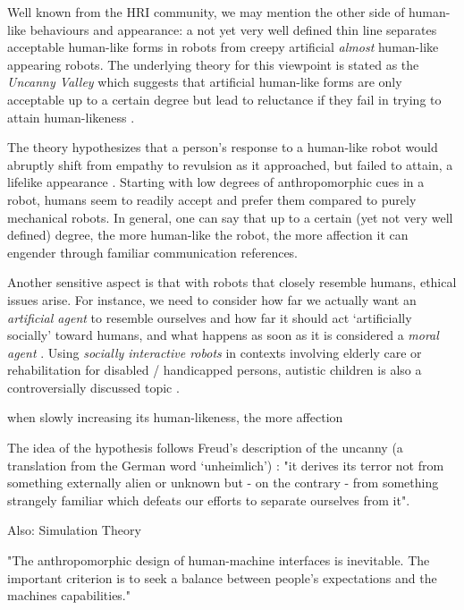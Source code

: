 \documentclass{acm_proc_article-sp}
\begin{document}
Well known from the HRI community, we may mention the other side of human-like
behaviours and appearance: a not yet very well defined thin line separates
acceptable human-like forms in robots from creepy artificial \textit{almost}
human-like appearing robots. The underlying theory for this viewpoint is stated
as the \textit{Uncanny Valley} \cite{mori_uncanny_1970} which suggests that
artificial human-like forms are only acceptable up to a certain degree but lead
to reluctance if they fail in trying to attain human-likeness .

The theory hypothesizes that a person's
response to a human-like robot would abruptly shift from empathy to revulsion
as it approached, but failed to attain, a lifelike appearance
\cite{mori_uncanny_1970}. Starting with low degrees of anthropomorphic cues in
a robot, humans seem to readily accept and prefer them compared to purely
mechanical robots. In general, one can say that up to a certain (yet not very
well defined) degree, the more human-like the robot, the more affection it can
engender through familiar communication references.

Another sensitive aspect is that with robots that closely resemble humans,
ethical issues arise. For instance, we need to consider how far we actually
want an \textit{artificial agent} to resemble ourselves and how far it should
act `artificially socially' toward humans, and what happens as soon as it is
considered a \textit{moral agent} \cite{sullins_when_2006}. Using
\textit{socially interactive robots} in contexts involving elderly care or
rehabilitation for disabled / handicapped persons, autistic children is also a
controversially discussed topic \cite{robins_robots_2005}.


when slowly increasing its human-likeness, the more affection 

The idea of the hypothesis follows Freud's description of the uncanny (a
translation from the German word `unheimlich') :
"it derives its terror not from something externally alien or unknown but - on
the contrary - from something strangely familiar which defeats our efforts to
separate ourselves from it". \cite{hegel_understanding_2008}

Also: Simulation Theory

"The anthropomorphic design of human-machine interfaces is inevitable. The
important criterion is to seek a balance between people's expectations and
the machines capabilities." \cite{duffy_anthropomorphism_2002}
\end{document}
